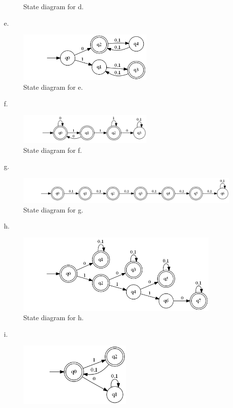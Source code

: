 \documentclass[10pt] {article}
\begin{document}
\begin{enumerate}
\begin{figure}[H]
\caption{State diagram for d.}
\label{8}
\end{figure} 
e.
\begin{figure}[H]
\includegraphics[width=0.6\textwidth]{e6.png}
\caption{State diagram for e.}
\label{8}
\end{figure} 
f.
\begin{figure}[H]
\includegraphics[width=0.6\textwidth]{f6.png}
\caption{State diagram for f.}
\label{8}
\end{figure} 
g.
\begin{figure}[H]
\includegraphics[width=1.1\textwidth]{g6.png}
\caption{State diagram for g.}
\label{8}
\end{figure} 
h.
\begin{figure}[H]
\includegraphics[width=0.9\textwidth]{h6.png}
\caption{State diagram for h.}
\label{8}
\end{figure} 
i.
\begin{figure}[H]
\includegraphics[width=0.5\textwidth]{ii6.png}

\end{figure}
\end{enumerate}
\end{document}
